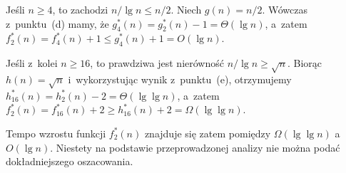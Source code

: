 Jeśli $n\ge4$, to zachodzi $n/\!\lg n\le n/2$. Niech $g(n)=n/2$. Wówczas z~punktu~(d) mamy, że $g_4^*(n)=g_2^*(n)-1=\Theta(\lg n)$, a~zatem $f_2^*(n)=f_4^*(n)+1\le g_4^*(n)+1=O(\lg n)$.

Jeśli z~kolei $n\ge16$, to prawdziwa jest nierówność $n/\!\lg n\ge\sqrt{n}$. Biorąc $h(n)=\sqrt{n}$ i~wykorzystując wynik z~punktu~(e), otrzymujemy $h_{16}^*(n)=h_2^*(n)-2=\Theta(\lg\lg n)$, a~zatem $f_2^*(n)=f_{16}^*(n)+2\ge h_{16}^*(n)+2=\Omega(\lg\lg n)$.

Tempo wzrostu funkcji $f_2^*(n)$ znajduje się zatem pomiędzy $\Omega(\lg\lg n)$ a~$O(\lg n)$. Niestety na podstawie przeprowadzonej analizy nie można podać dokładniejszego oszacowania.

\endinput